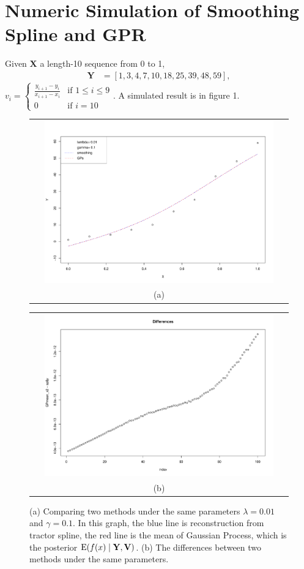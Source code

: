 \section{Numeric Simulation of Smoothing Spline and GPR}
Given $\mathbf{X}$ a length-10 sequence from 0 to 1, 
\begin{align*}
\mathbf{Y}&=\left[1,3,4,7,10,18,25,39,48,59 \right],
\end{align*}
$v_i=\begin{cases}
\frac{y_{i+1}-y_i}{x_{i+1}-x_i}&\mbox{if } 1\leq i \leq 9\\
0 & \mbox{if } i=10
\end{cases}$. 
A simulated result is in figure 1.
\begin{figure}[h]  
	\centering
	\begin{tabular}{c}
		\includegraphics[width=12cm,height=7cm]{Chapters/03GPR/plot/simu01} \\[\abovecaptionskip]
		\small (a) 
	\end{tabular}
	\begin{tabular}{c}
		\includegraphics[width=12cm,height=7cm]{Chapters/03GPR/plot/simu02} \\[\abovecaptionskip]
		\small (b) 
	\end{tabular}
	\caption{(a) Comparing two methods under the same parameters $\lambda=0.01$ and $\gamma=0.1$. In this graph, the blue line is reconstruction from tractor spline, the red line is the mean of Gaussian Process, which is the posterior $\mathrm{E} (f(x) \mid  \mathbf{Y}, \mathbf{V})$. (b) The differences between two methods under the same parameters.}
\end{figure}



